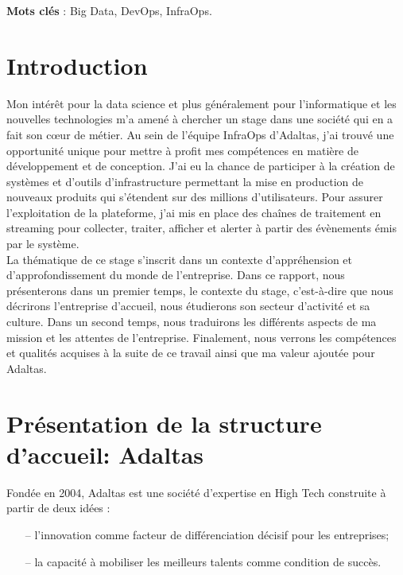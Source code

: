 \documentclass[12pt, french]{report}
\begin{document}
\noindent\textbf{Mots clés} : Big Data, DevOps, InfraOps.

\newpage
\thispagestyle{empty}
\mbox{}
\newpage

\begingroup
\hypersetup{linkcolor=black}
\listoffigures
\tableofcontents
\newpage
\endgroup

\chapter*{Introduction}

Mon intérêt pour la data science et plus généralement pour l’informatique et les nouvelles technologies m’a amené à chercher un stage dans une société qui en a fait son cœur de métier. Au sein de l'équipe InfraOps d'Adaltas, j'ai trouvé une opportunité unique pour mettre à profit mes compétences en matière de développement et de conception. J'ai eu la chance de participer à la création de systèmes et d'outils d'infrastructure permettant la mise en production de nouveaux produits qui s'étendent sur des millions d'utilisateurs. Pour assurer l’exploitation de la plateforme, j'ai mis en place des chaînes de traitement en streaming pour collecter, traiter, afficher et alerter à partir des évènements émis par le système.\\

La thématique de ce stage s’inscrit dans un contexte d’appréhension et d'approfondissement du monde de l’entreprise. Dans ce rapport, nous présenterons dans un premier temps, le contexte du stage, c’est-à-dire que nous décrirons l’entreprise d’accueil, nous étudierons son secteur d’activité et sa culture. Dans un second temps, nous traduirons les différents aspects de ma mission et les attentes de l'entreprise. Finalement, nous verrons les compétences et qualités acquises à la suite de ce travail ainsi que ma valeur ajoutée pour Adaltas.

\chapter{Présentation de la structure d'accueil: Adaltas}

Fondée en 2004, Adaltas est une société d’expertise en High Tech construite à partir de deux idées :
\begin{itemize}
  \item[--] l’innovation comme facteur de différenciation décisif pour les entreprises;
  \item[--] la capacité à mobiliser les meilleurs talents comme condition de succès.\\
\end{itemize}
\end{document}
